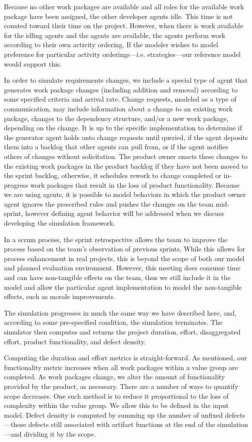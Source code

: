 Because no other work packages are available and all roles for the
available work package have been assigned, the other developer agents idle.
This time is not counted toward their time on the project.  However, when there
is work available for the idling agents and the agents are available, the agents
perform work according to their own activity ordering.  If the modeler wishes to
model preference for particular activity orderings---i.e.
strategies---our reference model would support this.

In order to simulate requirements changes, we include a special type of agent
that generates work package changes (including addition and removal) according
to some specified criteria and arrival rate.  Change requests, modeled as a type
of communication, may include information about a change to an existing work
package, changes to the dependency structure, and/or a new work package,
depending on the change.  It is up to the specific implementation to determine
if the generator agent holds onto change requests until queried, if the agent
deposits them into a backlog that other agents can pull from, or if the agent
notifies others of changes without solicitation.  The product owner enacts these
changes to the existing work packages in the product backlog if they have not
been moved to the sprint backlog, otherwise, it schedules rework to change
completed or in-progress work packages that result in the loss of product
functionality.  Because we are using agents, it is possible to model behaviors
in which the product owner agent ignores the prescribed rules and pushes the
changes on the team mid-sprint, however defining agent behavior will be
addressed when we discuss developing the simulation framework.

In a scrum process, the sprint retrospective allows the team to improve the
process based on the team's observation of previous sprints.  While this allows
for process enhancement in real projects, this is beyond the scope of both our
model and planned evaluation environment.  However, this meeting does consume
time and can have non-tangible effects on the team, thus we still include it in
the model and allow the particular agent implementation to model the
non-tangible effects, such as morale improvements.

The simulation progresses in much the same way we have described here, and,
according to some pre-specified condition, the simulation terminates.  The
simulator then computes and returns the project duration, effort, disaggregated
effort, product functionality, and defect density.  

Computing the duration and effort metrics is straight-forward.  As mentioned,
our functionality metric increases when all work packages within a value group
are completed.  As work packages change, we alter the amount of functionality
provided by the product, as necessary.
There are a number of ways to quantify scope decreases.  One such method is to
reduce it proportional to the loss of complexity within the value group.  We
allow this to be defined in the input model.
Defect density is computed by summing up the number of unfixed defects---those
defects still associated with artifact functions at the end of the
simulation---and dividing it by the scope.

